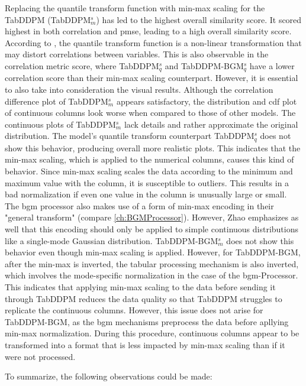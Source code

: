 Replacing the quantile transform function with min-max scaling for the TabDDPM (TabDDPM$^{s}_m$) has led to the highest overall similarity score.
It scored highest in both correlation and \gls{pmse}, leading to a high overall similarity score.
According to \cite{QuantileTransformer}, the quantile transform function is a non-linear transformation that may distort correlations between variables.
This is also observable in the correlation metric score, where TabDDPM$^{s}_q$ and TabDDPM-BGM$^{s}_q$ have a lower correlation score than their min-max scaling counterpart.
However, it is essential to also take into consideration the visual results.
Although the correlation difference plot of TabDDPM$^{s}_m$ appears satisfactory, the distribution and \gls{cdf} plot of continuous columns look worse when compared to those of other models. 
The continuous plots of TabDDPM$^{s}_m$ lack details and rather approximate the original distribution.
The model's quantile transform counterpart TabDDPM$^{s}_q$ does not show this behavior, producing overall more realistic plots.
This indicates that the min-max scaling, which is applied to the numerical columns, causes this kind of behavior.
Since min-max scaling scales the data according to the minimum and maximum value with the column, it is susceptible to outliers.
This results in a bad normalization if even one value in the column is unusually large or small.
The \gls{bgm} processor also makes use of a form of min-max encoding in their "general transform" \cite[p. 7]{zhao2022CTABGANEnhancingTabular} (compare \autoref{ch:BGMProcessor}).
However, Zhao \etal \cite{zhao2022CTABGANEnhancingTabular} emphasizes as well that this encoding should only be applied to simple continuous distributions like a single-mode Gaussian distribution.
TabDDPM-BGM$^{s}_m$ does not show this behavior even though min-max scaling is applied. 
However, for TabDDPM-BGM, after the min-max is inverted, the tabular processing mechanism is also inverted, which involves the mode-specific normalization in the case of the \gls{bgm}-Processor.
This indicates that applying min-max scaling to the data before sending it through TabDDPM reduces the data quality so that TabDDPM struggles to replicate the continuous columns.
However, this issue does not arise for TabDDPM-BGM, as the \gls{bgm} mechanisms preprocess the data before apllying min-max normalization.
During this procedure, continuous columns appear to be transformed into a format that is less impacted by min-max scaling than if it were not processed.

To summarize, the following observations could be made:

